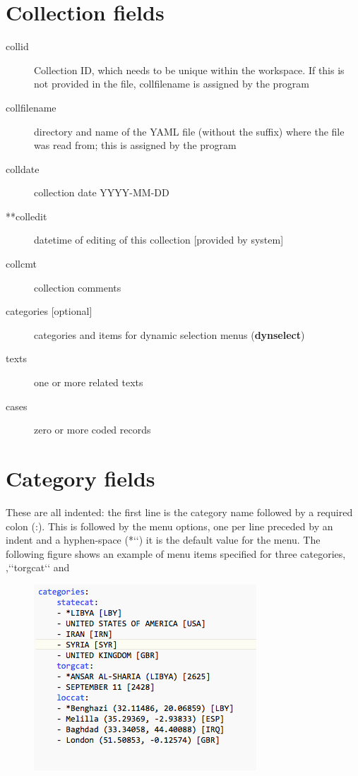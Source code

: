 \documentclass[letterpaper,10pt,english]{sphinxmanual}
\begin{document}
\section{Collection fields}
\label{appendix2:collection-fields}\begin{description}
\item[{collid}] \leavevmode
Collection ID, which needs to be unique within the workspace. If
this is not provided in the file, collfilename is assigned by the
program

\item[{collfilename}] \leavevmode
directory and name of the YAML file (without the suffix) where the
file was read from; this is assigned by the program

\item[{colldate}] \leavevmode
collection date YYYY-MM-DD

\item[{**colledit}] \leavevmode
datetime of editing of this collection  {[}provided by system{]}

\item[{collcmt}] \leavevmode
collection comments

\item[{categories {[}optional{]}}] \leavevmode
categories and items for dynamic selection menus (\textbf{dynselect})

\item[{texts}] \leavevmode
one or more related texts

\item[{cases}] \leavevmode
zero or more coded records

\end{description}


\section{Category fields}
\label{appendix2:category-fields}
These are all indented: the first line is the category name followed by a required colon (:). This is followed by the
menu options, one per line preceded by an indent and a hyphen-space (*{}`{}`)
it is the default value for the menu.  The following figure shows an example of menu items specified for three categories,
,{}`{}`torgcat{}`{}` and 
\begin{figure}[htbp]
\centering

\includegraphics{category_example.png}
\end{figure}
\end{document}
